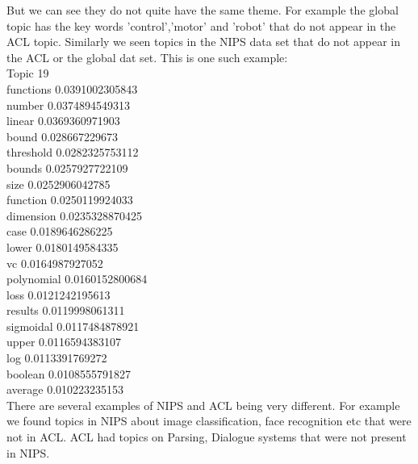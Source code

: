 \documentclass{article}
\begin{document}
But we can see they do not quite have the same theme. For example the global topic has the key words 'control','motor'
and 'robot' that do not appear in the ACL topic.
Similarly we seen topics in the NIPS data set that do not appear in the ACL or the global dat set.
This is one such example:\\
Topic 19\\
functions 0.0391002305843\\
number 0.0374894549313\\
linear 0.0369360971903\\
bound 0.028667229673\\
threshold 0.0282325753112\\
bounds 0.0257927722109\\
size 0.0252906042785\\
function 0.0250119924033\\
dimension 0.0235328870425\\
case 0.0189646286225\\
lower 0.0180149584335\\
vc 0.0164987927052\\
polynomial 0.0160152800684\\
loss 0.0121242195613\\
results 0.0119998061311\\
sigmoidal 0.0117484878921\\
upper 0.0116594383107\\
log 0.0113391769272\\
boolean 0.0108555791827\\
average 0.010223235153\\

There are several examples of NIPS and ACL being very different. For example we found topics in NIPS about image classification,
face recognition etc that were not in ACL. ACL had topics on Parsing, Dialogue systems that were not present in NIPS.
\end{document}
